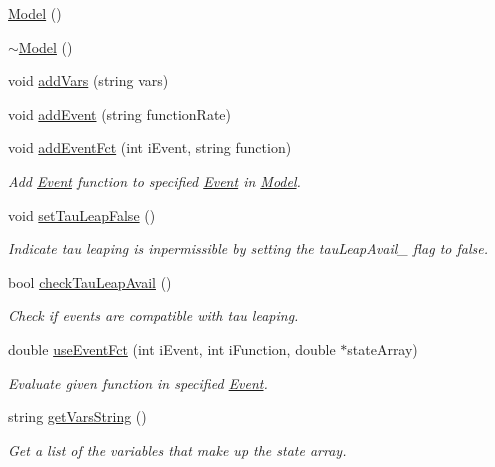 \begin{DoxyCompactItemize}
\item 
\hyperlink{class_model_ae3b375de5f6df4faf74a95d64748e048}{Model} ()
\item 
\hyperlink{class_model_ad6ebd2062a0b823db841a0b88baac4c0}{$\sim$\+Model} ()
\item 
void \hyperlink{class_model_a4743b4f267eeb1a60e21cc2995e1efcd}{add\+Vars} (string vars)
\item 
void \hyperlink{class_model_ab6f784e4ff8cdf3ee5e010ef4dd8d597}{add\+Event} (string function\+Rate)
\item 
void \hyperlink{class_model_a78d9b07bd5e819215c9aeefabb4cede7}{add\+Event\+Fct} (int i\+Event, string function)
\begin{DoxyCompactList}\small\item\em Add \hyperlink{class_event}{Event} function to specified \hyperlink{class_event}{Event} in \hyperlink{class_model}{Model}. \end{DoxyCompactList}\item 
void \hyperlink{class_model_a371ba260fc741531a08a197ea7446758}{set\+Tau\+Leap\+False} ()
\begin{DoxyCompactList}\small\item\em Indicate tau leaping is inpermissible by setting the tau\+Leap\+Avail\+\_\+ flag to false. \end{DoxyCompactList}\item 
bool \hyperlink{class_model_aeba8f871483d714448a0bbf509ab21e7}{check\+Tau\+Leap\+Avail} ()
\begin{DoxyCompactList}\small\item\em Check if events are compatible with tau leaping. \end{DoxyCompactList}\item 
double \hyperlink{class_model_a774d9fb034f8704a75d7b3568a87a3bc}{use\+Event\+Fct} (int i\+Event, int i\+Function, double $\ast$state\+Array)
\begin{DoxyCompactList}\small\item\em Evaluate given function in specified \hyperlink{class_event}{Event}. \end{DoxyCompactList}\item 
string \hyperlink{class_model_a9ee802e2090b51ae403d39f6ec0138d8}{get\+Vars\+String} ()
\begin{DoxyCompactList}\small\item\em Get a list of the variables that make up the state array. \end{DoxyCompactList}\item 

\end{DoxyCompactItemize}
